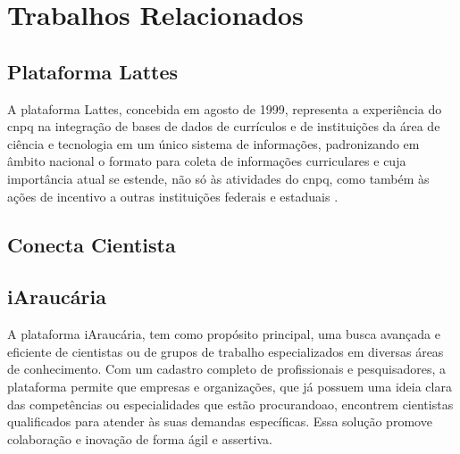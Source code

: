 \chapter{Trabalhos Relacionados}\label{cap:trabalhos:relacionados}

\section{Plataforma Lattes}\label{sec:lattes}

A plataforma Lattes, concebida em agosto de 1999, representa a experiência do \gls{cnpq} na integração de bases de dados de currículos e de instituições da área de ciência e tecnologia em um único sistema de informações, padronizando em âmbito nacional o formato para coleta de informações curriculares e cuja importância atual se estende, não só às atividades do \gls{cnpq}, como também às ações de incentivo a outras instituições federais e estaduais \cite{Lattes}.

\section{Conecta Cientista}\label{sec:conecta}


\section{iAraucária}\label{sec:conecta}

A plataforma iAraucária, tem como propósito principal, uma busca avançada e eficiente de cientistas ou de grupos de trabalho especializados em diversas áreas de conhecimento. Com um cadastro completo de profissionais e pesquisadores, a plataforma permite que empresas e organizações, que já possuem uma ideia clara das competências ou especialidades que estão procurandoao, encontrem cientistas qualificados para atender às suas demandas específicas. Essa solução promove colaboração e inovação de forma ágil e assertiva.